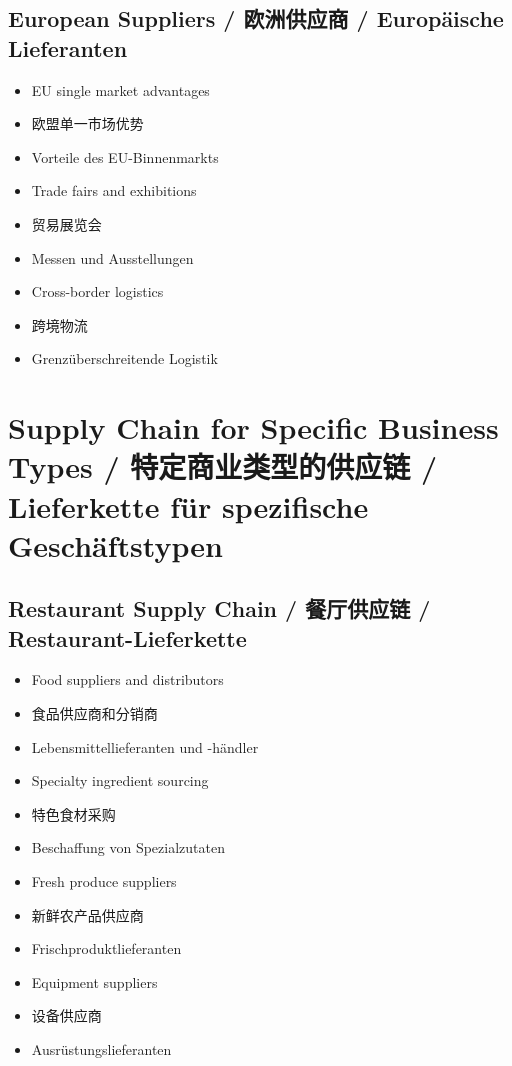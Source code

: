 \subsection{European Suppliers / 欧洲供应商 / Europäische Lieferanten}
\begin{itemize}
    \item EU single market advantages
    \item 欧盟单一市场优势
    \item Vorteile des EU-Binnenmarkts
    \item Trade fairs and exhibitions
    \item 贸易展览会
    \item Messen und Ausstellungen
    \item Cross-border logistics
    \item 跨境物流
    \item Grenzüberschreitende Logistik
\end{itemize}

\section{Supply Chain for Specific Business Types / 特定商业类型的供应链 / Lieferkette für spezifische Geschäftstypen}

\subsection{Restaurant Supply Chain / 餐厅供应链 / Restaurant-Lieferkette}
\begin{itemize}
    \item Food suppliers and distributors
    \item 食品供应商和分销商
    \item Lebensmittellieferanten und -händler
    \item Specialty ingredient sourcing
    \item 特色食材采购
    \item Beschaffung von Spezialzutaten
    \item Fresh produce suppliers
    \item 新鲜农产品供应商
    \item Frischproduktlieferanten
    \item Equipment suppliers
    \item 设备供应商
    \item Ausrüstungslieferanten
\end{itemize}

